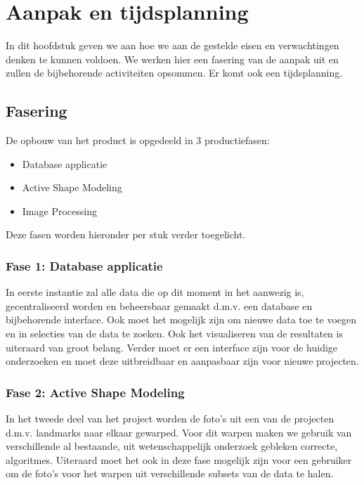 \section{Aanpak en tijdsplanning}
\label{aanpak_en_tijdsplanning}

In dit hoofdstuk geven we aan hoe we aan de gestelde eisen en verwachtingen denken te kunnen voldoen. 
We werken hier een fasering van de aanpak uit en zullen de bijbehorende activiteiten opsommen. 
Er komt ook een tijdsplanning.

\subsection{Fasering}

De opbouw van het product is opgedeeld in 3 productiefasen:
\begin{itemize}
	\item Database applicatie
	\item Active Shape Modeling
	\item Image Processing
\end{itemize}
Deze fasen worden hieronder per stuk verder toegelicht.

\subsubsection{Fase 1: Database applicatie}
In eerste instantie zal alle data die op dit moment in het \casamproject aanwezig is, gecentraliseerd worden en beheersbaar gemaakt d.m.v. een database en bijbehorende interface. 
Ook moet het mogelijk zijn om nieuwe data toe te voegen en in selecties van de data te zoeken. 
Ook het visualiseren van de resultaten is uiteraard van groot belang. 
Verder moet er een interface zijn voor de huidige onderzoeken en moet deze uitbreidbaar en aanpasbaar zijn voor nieuwe projecten.

\subsubsection{Fase 2: Active Shape Modeling}
In het tweede deel van het project worden de foto's uit een van de projecten d.m.v. landmarks naar elkaar gewarped. 
Voor dit warpen maken we gebruik van verschillende al bestaande, uit wetenschappelijk onderzoek gebleken correcte, algoritmes.
Uiteraard moet het ook in deze fase mogelijk zijn voor een gebruiker om de foto's voor het warpen uit verschillende subsets van de data te halen.

